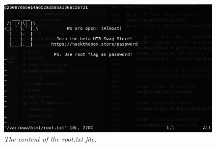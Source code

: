 \begin{figure}[H]
	\centering
	\captionsetup{justification=centering}
	\noindent \includegraphics[width=\textwidth]{figures/root.png}
	\caption{\emph{The content of the root.txt file.}}
	\label{fig:root}
\end{figure}